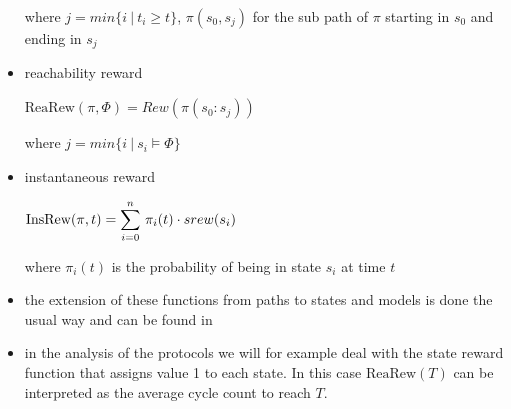 \documentclass[a4paper, 10pt]{article}
\begin{document}
\begin{itemize}
		where $j = min \{ i~|~t_i \ge t \}$, $\pi(s_0,s_j)$ for the sub path of $\pi$ starting in $s_0$ and ending in $s_j$
	\item reachability reward
		\begin{center}
			$\mathrm{ReaRew}(\pi, \Phi) = \mathit{Rew}(\pi(s_0:s_j))$
		\end{center}
		where $j = min \{ i~|~s_i \models \Phi \}$
	\item instantaneous reward
		\begin{center}
			$\mathrm{InsRew}(\pi , t) = \mathlarger{ \sum }\limits_{i=0}^{n}~\pi_i(t) \cdot srew(s_i)$
		\end{center}
		where $\pi_i(t)$ is the probability of being in state $s_i$ at time $t$
	\item the extension of these functions from paths to states and models is done the usual way and can be found in \cite{bhhk03}
	\item in the analysis of the protocols we will for example deal with the state reward function that assigns value 1 to each state. In this case $\mathrm{ReaRew}(T)$ can be interpreted as the average cycle count to reach $T$.
\end{itemize}

\end{document}
